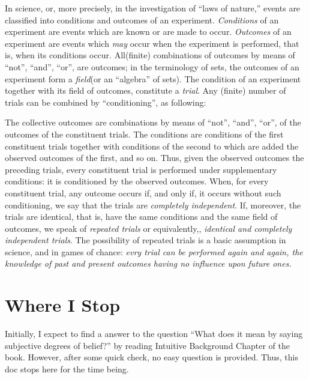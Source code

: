 \documentclass[a4paper]{article}
\begin{document}
In science, or, more precisely, in the investigation of ``laws of
nature,'' events are classified into conditions and outcomes of an
experiment. \textit{Conditions} of an experiment are events which are known or
are made to occur. \textit{Outcomes} of an experiment are events which
\textit{may} occur when the experiment is performed, that is, when its
conditions occur. All(finite) combinations of outcomes by means of
``not'', ``and'', ``or'', are outcomes; in the terminology of sets, the
outcomes of an experiment form a \textit{field}(or an ``algebra'' of
sets). The condition of an experiment together with its field of
outcomes, constitute a \textit{trial}. Any (finite) number of trials can
be combined by ``conditioning'', as following:

The collective outcomes are combinations by means of ``not'', ``and'',
``or'', of the outcomes of the constituent trials. The conditions are
conditions of the first constituent trials together with conditions of
the second to which are added the observed outcomes of the first, and so
on. Thus, given the observed outcomes the preceding trials, every
constituent trial is performed under supplementary conditions: it is
conditioned by the observed outcomes. When, for every constituent trial,
any outcome occurs if, and only if, it occurs without such conditioning,
we say that the trials are \textit{completely independent}. If,
moreover, the trials are identical, that is, have the same conditions
and the same field of outcomes, we speak of \textit{repeated trials} or
equivalently,, \textit{identical and completely independent trials}. The
possibility of repeated trials is a basic assumption in science, and in
games of chance: \textit{evry trial can be performed again and again,
the knowledge of past and present outcomes having no influence upon
future ones.}\cite{1977probability}

\section{Where I Stop}
	Initially, I expect to find a answer to the question ``What does it
	mean by saying subjective degrees of belief?'' by reading Intuitive
	Background Chapter of the book\cite{1977probability}. However, after
	some quick check, no easy question is provided. Thus, this doc stops
	here for the time being.







\end{document}
